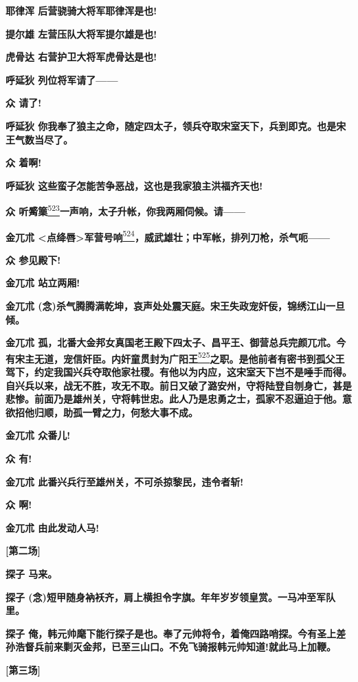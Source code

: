 \textbf{耶律浑 后营骁骑大将军耶律浑是也!}

\textbf{提尔雄 左营压队大将军提尔雄是也!}

\textbf{虎骨达 右营护卫大将军虎骨达是也!}

\textbf{呼延狄 列位将军请了------}

\textbf{众 请了!}

\textbf{呼延狄
你我奉了狼主之命，随定四太子，领兵夺取宋室天下，兵到即克。也是宋王气数当尽了。}

\textbf{众 着啊!}

\textbf{呼延狄 这些蛮子怎能苦争恶战，这也是我家狼主洪福齐天也!}

\textbf{众
听觱篥}\protect\hyperlink{fn523}{\textsuperscript{523}}\textbf{一声响，太子升帐，你我两厢伺候。请------}

\textbf{金兀朮
\textless{}点绛唇\textgreater{}军营号响}\protect\hyperlink{fn524}{\textsuperscript{524}}\textbf{，威武雄壮；中军帐，排列刀枪，杀气呃------}

\textbf{众 参见殿下!}

\textbf{金兀朮 站立两厢!}

\textbf{金兀朮
(念)杀气腾腾满乾坤，哀声处处震天庭。宋王失政宠奸佞，锦绣江山一旦倾。}

\textbf{金兀朮
孤，北番大金邦女真国老王殿下四太子、昌平王、御营总兵完颜兀朮。今有宋主无道，宠信奸臣。内奸童贯封为广阳王}\protect\hyperlink{fn525}{\textsuperscript{525}}\textbf{之职。是他前者有密书到孤父王驾下，约定我国兴兵夺取他家社稷。有他以为内应，这宋室天下岂不是唾手而得。自兴兵以来，战无不胜，攻无不取。前日又破了潞安州，守将陆登自刎身亡，甚是悲惨。前面乃是雄州关，守将韩世忠。此人乃是忠勇之士，孤家不忍逼迫于他。意欲招他归顺，助孤一臂之力，何愁大事不成。}

\textbf{金兀朮 众番儿!}

\textbf{众 有!}

\textbf{金兀朮 此番兴兵行至雄州关，不可杀掠黎民，违令者斩!}

\textbf{众 啊!}

\textbf{金兀朮 由此发动人马!}

\textbf{{[}第二场{]}}

\textbf{探子 马来。}

\textbf{探子
(念)短甲随身衲袄齐，肩上横担令字旗。年年岁岁领皇赏。一马冲至军队里。}

\textbf{探子
俺，韩元帅麾下能行探子是也。奉了元帅将令，着俺四路哨探。今有圣上差孙浩督兵前来剿灭金邦，已至三山口。不免飞骑报韩元帅知道!就此马上加鞭。}

\textbf{{[}第三场{]}}

